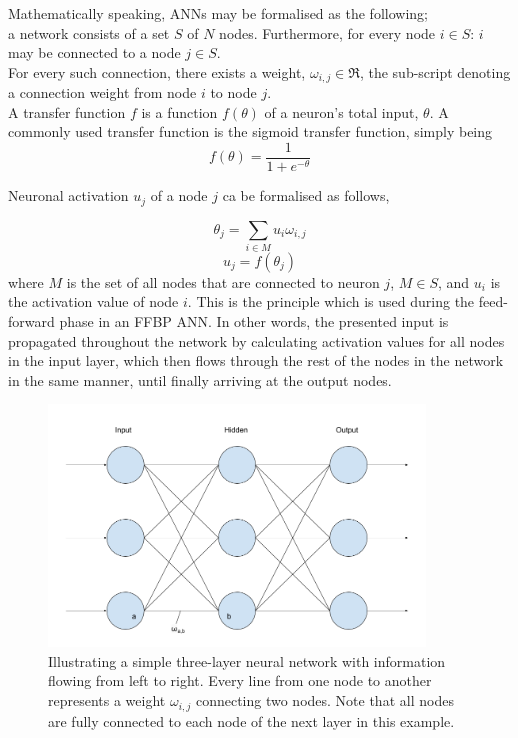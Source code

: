 Mathematically speaking, ANNs may be formalised as the following;
\\
a network consists of a set $S$ of $N$ nodes. Furthermore, for every node $i\in S$: $i$ may be connected to a node $j \in S$.
\\
For every such connection, there exists a weight, $\omega_{i,j} \in \Re$, the sub-script denoting a connection weight from node $i$ to node $j$.
\\
A transfer function $f$ is a function $f(\theta)$ of a neuron's total input, $\theta$. A commonly used transfer function is the sigmoid transfer function, simply being 
\begin{equation}\label{sigmoid}
    f(\theta) = \frac{1}{1+e^{-\theta}}
\end{equation}

Neuronal activation $u_j$ of a node $j$ ca be formalised as follows,

\begin{equation}\label{input}
    \theta_j = \sum_{i\in M} u_i \omega_{i,j}
\end{equation}
\begin{equation}\label{activation}
    u_j = f(\theta_j)
\end{equation}
where $M$ is the set of all nodes that are connected to neuron $j$, $M \in S$, and $u_i$ is the activation value of node $i$. This is the principle which is used during the feed-forward phase in an FFBP ANN. In other words, the presented input is propagated throughout the network by calculating activation values for all nodes in the input layer, which then flows through the rest of the nodes in the network in the same manner, until finally arriving at the output nodes.

\begin{figure}
\centering
\includegraphics[width=10cm]{fig/three_layers_weight}
\caption{Illustrating a simple three-layer neural network with information flowing from left to right. Every line from one node to another represents a weight $\omega_{i,j}$ connecting two nodes. Note that all nodes are fully connected to each node of the next layer in this example.}
\label{fig:three_layer_ann}
\end{figure}


